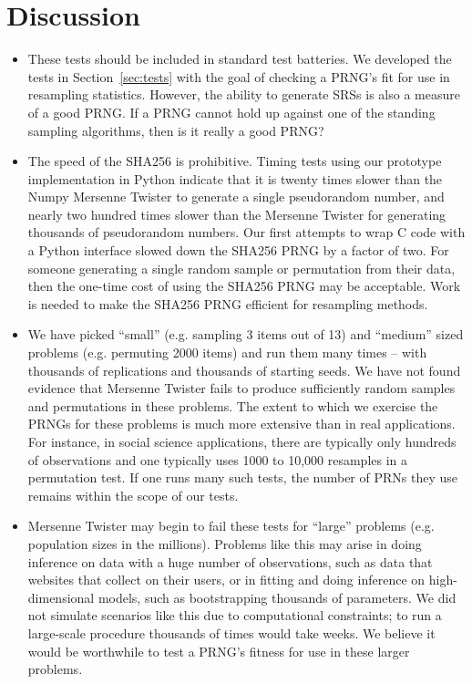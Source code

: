 \documentclass[12pt]{article}
\newcommand{\todo}[1]{{\color{red}{TO DO: \sc #1}}}
\begin{document}
\section{Discussion}\label{sec:discussion}



\todo{
Points to hit:
}

\begin{itemize}
\item These tests should be included in standard test batteries.
We developed the tests in Section~\ref{sec:tests} with the goal of checking a PRNG's fit for use in resampling statistics.
However, the ability to generate SRSs is also a measure of a good PRNG.
If a PRNG cannot hold up against one of the standing sampling algorithms, then is it really a good PRNG?

\item The speed of the SHA256 is prohibitive. 
Timing tests using our prototype implementation in Python indicate that it is twenty times slower than the Numpy Mersenne Twister to generate a single pseudorandom number, and nearly two hundred times slower than the Mersenne Twister for generating thousands of pseudorandom numbers.
Our first attempts to wrap C code with a Python interface slowed down the SHA256 PRNG by a factor of two.
For someone generating a single random sample or permutation from their data, then the one-time cost of using the SHA256 PRNG may be acceptable.
Work is needed to make the SHA256 PRNG efficient for resampling methods.

\item We have picked ``small'' (e.g. sampling 3 items out of 13) and ``medium'' sized problems (e.g. permuting 2000 items) and run them many times -- with thousands of replications and thousands of starting seeds.
We have not found evidence that Mersenne Twister fails to produce sufficiently random samples and permutations in these problems.
The extent to which we exercise the PRNGs for these problems is much more extensive than in real applications.
For instance, in social science applications, there are typically only hundreds of observations and one typically uses 1000 to 10,000 resamples in a permutation test.
If one runs many such tests, the number of PRNs they use remains within the scope of our tests.

\item Mersenne Twister may begin to fail these tests for ``large'' problems (e.g. population sizes in the millions).
Problems like this may arise in doing inference on data with a huge number of observations, 
such as data that websites that collect on their users,
or in fitting and doing inference on high-dimensional models, 
such as bootstrapping thousands of parameters.
We did not simulate scenarios like this due to computational constraints;
to run a large-scale procedure thousands of times would take weeks.
We believe it would be worthwhile to test a PRNG's fitness for use in these larger problems.


\end{itemize}
\end{document}
